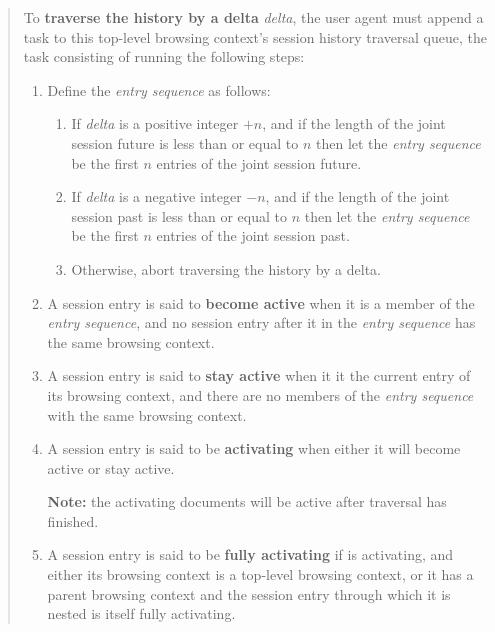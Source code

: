 \documentclass{notes}
\begin{document}
\begin{quote}
  To \textbf{traverse the history by a delta} \emph{delta}, the user
  agent must append a task to this top-level browsing context's session
  history traversal queue, the task consisting of running the following
  steps:
  \begin{enumerate}
  \item Define the \emph{entry sequence}
    as follows:
    \begin{enumerate}

    \item If \emph{delta} is a positive integer $+n$, and if the length of the
      joint session future is less than or equal to $n$ then let the \emph{entry sequence}
      be the first $n$ entries of the joint session future.

    \item If \emph{delta} is a negative integer $-n$, and if the length of the
      joint session past is less than or equal to $n$ then let the \emph{entry sequence}
      be the first $n$ entries of the joint session past.

    \item Otherwise, abort traversing the history by a delta.

    \end{enumerate}

  \item A session entry is said to \textbf{become active} when
    it is a member of the \emph{entry sequence}, and no
    session entry after it in the \emph{entry sequence} has the same
    browsing context.

  \item A session entry is said to \textbf{stay active} when it it the
    current entry of its browsing context, and there are no members of
    the \emph{entry sequence} with the same browsing context.

  \item A session entry is said to be \textbf{activating} when either
    it will become active or stay active.

    \textbf{Note:} the activating documents
    will be active after traversal has finished.

  \item A session entry is said to be \textbf{fully activating} if
    is activating, and either its browsing context is a top-level
    browsing context, or it has a parent browsing context
    and the session entry through which it is nested is itself fully activating.


\end{enumerate}
\end{quote}
\end{document}
